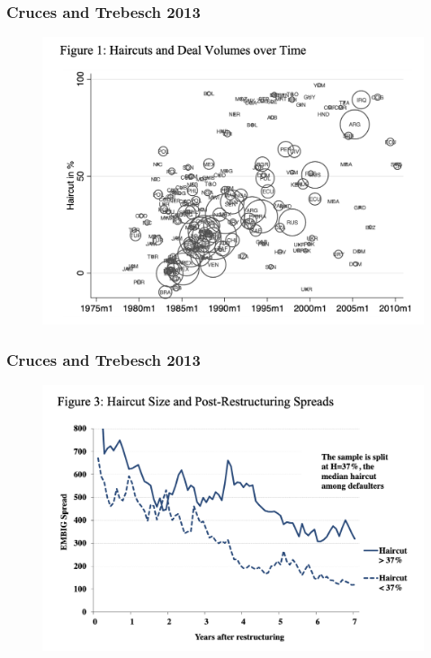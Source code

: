 \documentclass{beamer}
\begin{document}
\begin{frame}
\frametitle{Cruces and Trebesch  2013 }
\begin{figure}
\centering
\includegraphics[scale=0.5]{CrucesTrebesch.png}
\end{figure}
\end{frame}

\begin{frame}
\frametitle{Cruces and Trebesch  2013 }
\begin{figure}
\centering
\includegraphics[scale=0.5]{CrucesTrebesch2.png}
\end{figure}
\end{frame}
\end{document}
